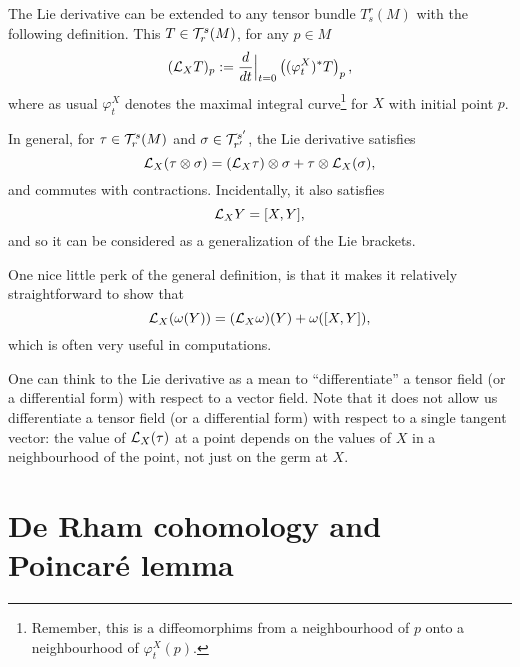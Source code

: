 \begin{remark}
  The Lie derivative can be extended to any tensor bundle $T_s^r(M)$ with the following definition.
  This $T\in\mathcal{T}_r^s(M)$, for any $p\in M$
  \begin{equation}
    (\mathcal{L}_X T)_p := \frac{d}{dt}\Big|_{t=0}\left((\varphi_t^X)^* T\right)_p,
  \end{equation}
  where as usual $\varphi_t^X$ denotes the maximal integral curve\footnote{Remember, this is a diffeomorphims from a neighbourhood of $p$ onto a neighbourhood of $\varphi_t^X(p)$.} for $X$ with initial point $p$.

  In general, for $\tau\in\mathcal{T}_r^s(M)$ and $\sigma\in\mathcal{T}_{r'}^{s'}$, the Lie derivative satisfies
  \begin{equation}
    \mathcal{L}_X(\tau\otimes\sigma) = (\mathcal{L}_X\tau)\otimes\sigma + \tau\otimes\mathcal{L}_X(\sigma),
  \end{equation}
  and commutes with contractions.
  Incidentally, it also satisfies
  \begin{equation}
    \mathcal{L}_XY = [X,Y],
  \end{equation}
  and so it can be considered as a generalization of the Lie brackets.

  One nice little perk of the general definition, is that it makes it relatively straightforward to show that
  \begin{equation}\label{eq:cLXwBrackets}
    \mathcal{L}_X(\omega(Y)) = (\mathcal{L}_X\omega)(Y) + \omega([X,Y]),
  \end{equation}
  which is often very useful in computations.

  One can think to the Lie derivative as a mean to ``differentiate'' a tensor field (or a differential form) with respect to a vector field.
  Note that it does not allow us differentiate a tensor field (or a differential form) with respect to a single tangent vector: the value of $\mathcal{L}_X(\tau)$ at a point depends on the values of $X$ in a neighbourhood of the point, not just on the germ at $X$.
\end{remark}

\section{De Rham cohomology and Poincar\'e lemma}

